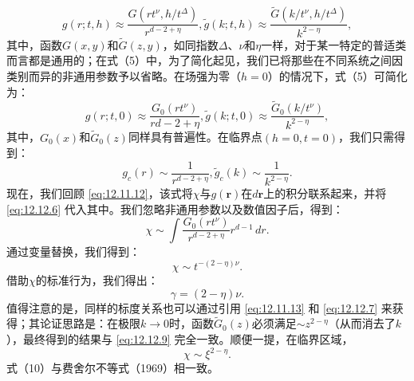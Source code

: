 \begin{equation}\tag{12.12.5}\label{eq:12.12.5}
g ( r ; t , h ) \approx \frac { G ( r t ^{\nu} , h / t ^{\Delta} ) } { r ^{d - 2 + \eta} } ,  \tilde { g } ( k ; t , h ) \approx \frac { \tilde { G } ( k / t ^{\nu} , h / t ^{\Delta} ) } { k ^{2 - \eta} } ,
\end{equation}
其中，函数\(G(x,y)\)和\(\tilde{G}(z,y)\)，如同指数\(\Delta\)、\(\nu\)和\(\eta\)一样，对于某一特定的普适类而言都是通用的；在式（5）中，为了简化起见，我们已将那些在不同系统之间因类别而异的非通用参数予以省略。在场强为零（\(h=0\)）的情况下，式（5）可简化为：
\begin{equation}\tag{12.12.6}\label{eq:12.12.6}
g ( r ; t , 0 ) \approx \frac { G _ { 0 } ( r t ^{\nu} ) } { r d - 2 + \eta } ,  \tilde { g } ( k ; t , 0 ) \approx \frac { \tilde { G } _ { 0 } ( k / t ^{\nu} ) } { k ^{2 - \eta} } ,
\end{equation}
其中，\(G_{0}(x)\)和\(\tilde{G}_{0}(z)\)同样具有普遍性。在临界点\((h=0, t=0)\)，我们只需得到：
\begin{equation}\tag{12.12.7}\label{eq:12.12.7}
g _ { c } ( r ) \sim \frac { 1 } { r ^{d - 2 + \eta} } ,  \tilde { g } _ { c } ( k ) \sim \frac { 1 } { k ^{2 - \eta} } .
\end{equation}
现在，我们回顾 \autoref{eq:12.11.12}，该式将\(\chi\)与\(g(\boldsymbol{r})\)在\(d\boldsymbol{r}\)上的积分联系起来，并将 \autoref{eq:12.12.6} 代入其中。我们忽略非通用参数以及数值因子后，得到：
\begin{equation}\tag{12.12.8}\label{eq:12.12.8}
\chi \sim \int \frac { G _ { 0 } ( r t ^{\nu} ) } { r ^{d - 2 + \eta} } r ^{d - 1} \, d r .
\end{equation}
通过变量替换，我们得到：
\begin{equation}\tag{12.12.9}\label{eq:12.12.9}
\chi \sim t ^{- ( 2 - \eta ) \nu} .
\end{equation}
借助\(\chi\)的标准行为，我们得出：
\begin{equation}\tag{12.12.10}\label{eq:12.12.10}
\gamma = ( 2 - \eta ) \nu .
\end{equation}
值得注意的是，同样的标度关系也可以通过引用 \autoref{eq:12.11.13} 和 \autoref{eq:12.12.7} 来获得；其论证思路是：在极限\(k \to 0\)时，函数\(\tilde{G}_0(z)\)必须满足\(\sim z^{2-\eta}\)（从而消去了\(k\)），最终得到的结果与 \autoref{eq:12.12.9} 完全一致。顺便一提，在临界区域，
\begin{equation}\tag{12.12.11}\label{eq:12.12.11}
\chi \sim \xi ^{2 - \eta} .
\end{equation}
式（10）与费舍尔不等式（1969）相一致。
